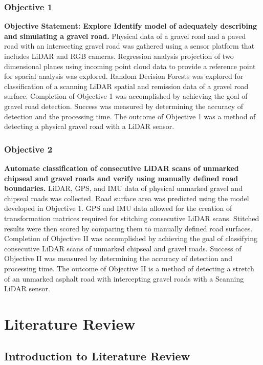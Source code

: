 \documentclass[numbered,pdftex]{ohio-etd}
\begin{document}
{	\subsection{Objective 1}
	
		{\textbf{Objective Statement: Explore Identify model of adequately describing and simulating a gravel road.} Physical data of a gravel road and a paved road with an intersecting gravel road was gathered using a sensor platform that includes LiDAR and RGB cameras. Regression analysis projection of two dimensional planes using incoming point cloud data to provide a reference point for spacial analysis was explored. Random Decision Forests was explored for classification of a scanning LiDAR spatial and remission data of a gravel road surface. Completion of Objective 1 was accomplished by achieving the goal of gravel road detection. Success was measured by determining the accuracy of detection and the processing time. The outcome of Objective 1 was a method of detecting a physical gravel road with a LiDAR sensor.}

	\subsection{Objective 2}

		{\textbf{Automate classification of consecutive LiDAR scans of unmarked chipseal and gravel roads and verify using manually defined road boundaries.} LiDAR, GPS, and IMU data of physical unmarked gravel and chipseal roads was collected. Road surface area was predicted using the model developed in Objective 1. GPS and IMU data allowed for the creation of transformation matrices required for stitching consecutive LiDAR scans. Stitched results were then scored by comparing them to manually defined road surfaces. Completion of Objective II was accomplished by achieving the goal of classifying consecutive LiDAR scans of unmarked chipseal and gravel roads. Success of Objective II was measured by determining the accuracy of detection and processing time. The outcome of Objective II is a method of detecting a stretch of an unmarked asphalt road with intercepting gravel roads with a Scanning LiDAR sensor.}


\chapter{Literature Review}

	\section{Introduction to Literature Review}
		
}
\end{document}

